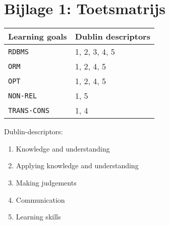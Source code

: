 \section*{Bijlage 1: Toetsmatrijs}
	\begin{tabular}{|p{1cm}|p{4cm}|}
		\hline
		Learning goals & Dublin descriptors \\
		\hline
		\texttt{RDBMS} & 1, 2, 3, 4, 5 \\
		\hline
		\texttt{ORM} & 1, 2, 4, 5 \\
		\hline
		\texttt{OPT} & 1, 2, 4, 5 \\
		\hline
		\texttt{NON-REL} & 1, 5 \\
		\hline
		\texttt{TRANS-CONS} & 1, 4 \\
		\hline
	\end{tabular}
	
	\vspace{1cm}

	Dublin-descriptors:
	\begin{enumerate}
		\item Knowledge and understanding
		\item Applying knowledge and understanding
		\item Making judgements
		\item Communication
		\item Learning skills
	\end{enumerate}
